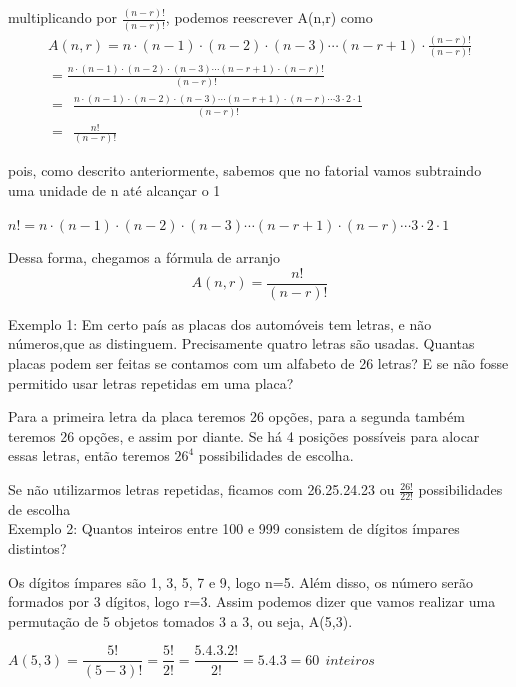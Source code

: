 \noindent
multiplicando por $\frac{(n-r)!}{(n-r)!}$, podemos reescrever A(n,r) como\\

\begin{gather*}
	\nonumber
	A(n,r) =  n \cdot (n-1) \cdot (n-2) \cdot (n-3)\cdots (n-r+1) \cdot \frac{(n-r)!}{(n-r)!}\\
=\frac{n \cdot (n-1) \cdot (n-2) \cdot (n-3)\cdots (n-r+1) \cdot (n-r)!}{(n-r)!}\\
=\ \ \frac{n \cdot (n-1) \cdot (n-2) \cdot (n-3)\cdots (n-r+1) \cdot (n-r) \cdots 3 \cdot 2 \cdot 1}{(n-r)!}\\
=\ \ \frac{n!}{(n-r)!}
\end{gather*}

pois, como descrito anteriormente, sabemos que no fatorial vamos subtraindo uma unidade de n até alcançar o 1

\begin{center}
	$n! = n \cdot (n-1) \cdot (n-2) \cdot (n-3)\cdots (n-r+1) \cdot (n-r) \cdots 3 \cdot 2 \cdot 1$
\end{center}

\noindent
Dessa forma, chegamos a fórmula de arranjo
\begin{equation}
A(n,r) = \frac{n!}{(n-r)!}
\end{equation}

\noindent
Exemplo 1: Em certo país as placas dos automóveis tem letras, e não números,que as distinguem. Precisamente quatro letras são usadas. Quantas placas podem ser feitas se contamos com um alfabeto de 26 letras? E se não fosse permitido usar letras repetidas em uma placa?

Para a primeira letra da placa teremos 26 opções, para a segunda também teremos 26 opções, e assim por diante. Se há 4 posições possíveis para alocar essas letras, então teremos $26^4$ possibilidades de escolha.

Se não utilizarmos letras repetidas, ficamos com 26.25.24.23 ou  $\frac{26!}{22!}$ possibilidades de escolha\\

\noindent
Exemplo 2: Quantos inteiros entre 100 e 999 consistem de dígitos ímpares distintos?

Os dígitos ímpares são 1, 3, 5, 7 e 9, logo n=5. Além disso, os número serão formados por 3 dígitos, logo r=3. Assim podemos dizer que vamos realizar uma permutação de 5 objetos tomados 3 a 3, ou seja, A(5,3).

\begin{center}
	$A(5,3) = \dfrac{5!}{(5-3)!}= \dfrac{5!}{2!}=\dfrac{5.4.3.2!}{2!}=5.4.3=60 \ \ inteiros$
\end{center}


